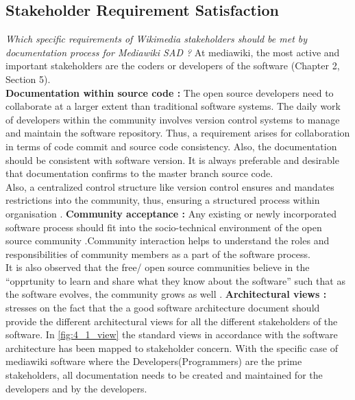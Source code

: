 \subsection{Stakeholder Requirement Satisfaction}
\indent \emph {Which specific requirements of Wikimedia stakeholders should be met by documentation process for Mediawiki SAD ?}
At mediawiki, the most active and important stakeholders are the coders or developers of the software (Chapter 2, Section 5).
\newline
\\\indent \textbf{Documentation within source code : }  The open source developers need to collaborate at a larger extent than traditional software systems. The daily work of developers within the community involves version control systems to manage and maintain the software repository. Thus, a requirement arises for collaboration in terms of code commit and source code consistency. Also, the documentation should be consistent with software version. It is always preferable  and desirable that documentation confirms to the master branch source code.
\\\indent Also, a centralized control structure like version control ensures and mandates restrictions into the community, thus, ensuring a structured process within organisation \cite{Wu2001}.
\newline
\indent \textbf{Community acceptance : }Any existing or newly incorporated software process should fit into the socio-technical environment of the open source community \cite{Mens2011}.Community interaction helps to understand the roles and responsibilities of community members as a part of the software process. 
\\\indent It is also observed that the free/ open source communities believe in the \enquote{opprtunity to learn and share what they know about the software} such that as the software evolves, the community grows as well \cite{Scacchi2006}.
\newline
\indent \textbf{Architectural views : }\cite{BachmannDocumentingSoftware2010} stresses on the fact that the a good software architecture document should provide the different architectural views for all the different stakeholders of the software. In \autoref{fig:4_1_view} the standard views in accordance with the software architecture has been mapped to stakeholder concern. With the specific case of mediawiki software where the Developers(Programmers) are the prime stakeholders, all documentation needs to be created and maintained for the developers and by the developers. 
